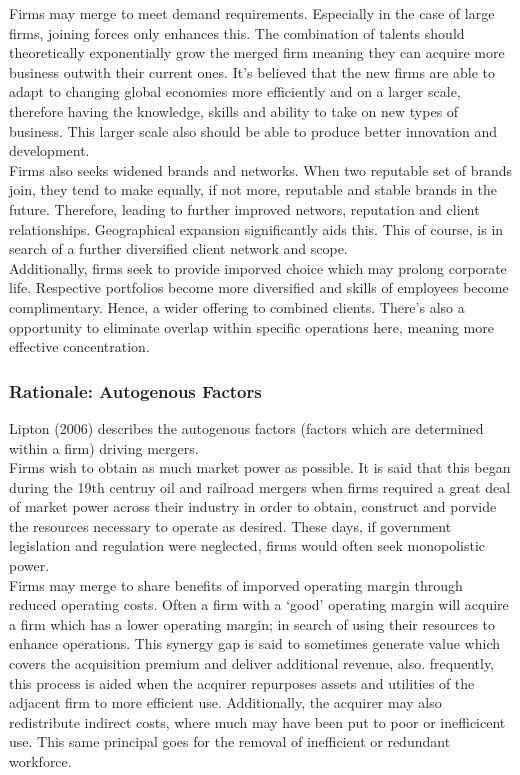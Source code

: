 \documentclass[11pt, english]{article}
\begin{document}
	Firms may merge to meet demand requirements. Especially in the case of large firms, joining forces only enhances this. The combination of talents should theoretically exponentially grow the merged firm meaning they can acquire more business outwith their current ones. It’s believed that the new firms are able to adapt to changing global economies more efficiently and on a larger scale, therefore having the knowledge, skills and ability to take on new types of business. This larger scale also should be able to produce better innovation and development.\\

	Firms also seeks widened brands and networks. When two reputable set of brands join, they tend to make equally, if not more, reputable and stable brands in the future. Therefore, leading to further improved networs, reputation and client relationships. Geographical expansion significantly aids this. This of course, is in search of a further diversified client network and scope.\\

	Additionally, firms seek to provide imporved choice which may prolong corporate life. Respective portfolios become more diversified and skills of employees become complimentary. Hence, a wider offering to combined clients. There's also a opportunity to eliminate overlap within specific operations here, meaning more effective concentration.

		\subsubsection*{Rationale: Autogenous Factors}

	Lipton (2006) describes the autogenous factors (factors which are determined within a firm) driving mergers.\\

	Firms wish to obtain as much market power as possible. It is said that this began during the 19$\mathrm{th}$ centruy oil and railroad mergers when firms required a great deal of market power across their industry in order to obtain, construct and porvide the resources necessary to operate as desired. These days, if government legislation and regulation were neglected, firms would often seek monopolistic power.\\

	Firms may merge to share benefits of imporved operating margin through reduced operating costs. Often a firm with a `good' operating margin will acquire a firm which has a lower operating margin; in search of using their resources to enhance operations. This synergy gap is said to sometimes generate value which covers the acquisition premium and deliver additional revenue, also. frequently, this process is aided when the acquirer repurposes assets and utilities of the adjacent firm to more efficient use. Additionally, the acquirer may also redistribute indirect costs, where much may have been put to poor or inefficicent use. This same principal goes for the removal of inefficient or redundant workforce.\\
\end{document}
